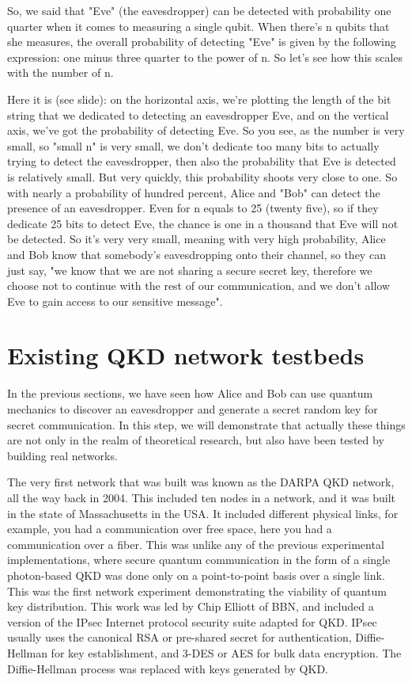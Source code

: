 So, we said that "Eve" (the eavesdropper) can be detected with probability one quarter when it comes to measuring a single qubit. When there's n qubits that she measures, the overall probability of detecting "Eve" is given by the following expression: one minus three quarter to the power of n. So let's see how this scales with the number of n.

Here it is (see slide): on the horizontal axis, we're plotting the length of the bit string that we dedicated to detecting an eavesdropper Eve, and on the vertical axis, we've got the probability of detecting Eve. So you see, as the number is very small, so "small n" is very small, we don't dedicate too many bits to actually trying to detect the eavesdropper, then also the probability that Eve is detected is relatively small. But very quickly, this probability shoots very close to one. So with nearly a probability of hundred percent, Alice and "Bob" can detect the presence of an eavesdropper. Even for n equals to 25 (twenty five), so if they dedicate 25 bits to detect Eve, the chance is one in a thousand that Eve will not be detected. So it's very very small, meaning with very high probability, Alice and Bob know that somebody's eavesdropping onto their channel, so they can just say, "we know that we are not sharing a secure secret key, therefore we choose not to continue with the rest of our communication, and we don't allow Eve to gain access to our sensitive message".

\section{Existing QKD network testbeds}

In the previous sections, we have seen how Alice and Bob can use quantum mechanics to discover an eavesdropper and generate a secret random key for secret communication. In this step, we will demonstrate that actually these things are not only in the realm of theoretical research, but also have been tested by building real networks.

The very first network that was built was known as the DARPA QKD network, all the way back in 2004. This included ten nodes in a network, and it was built in the state of Massachusetts in the USA. It included different physical links, for example, you had a communication over free space, here you had a communication over a fiber. This was unlike any of the previous experimental implementations, where secure quantum communication in the form of a single photon-based QKD was done only on a point-to-point basis over a single link. This was the first network experiment demonstrating the viability of quantum key distribution.  This work was led by Chip Elliott of BBN, and included a version of the IPsec Internet protocol security suite adapted for QKD.  IPsec usually uses the canonical RSA or pre-shared secret for authentication, Diffie-Hellman for key establishment, and 3-DES or AES for bulk data encryption.  The Diffie-Hellman process was replaced with keys generated by QKD.

